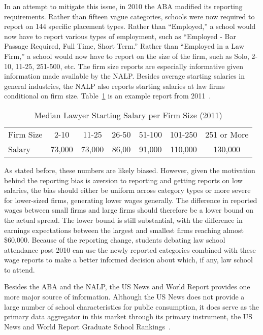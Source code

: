 \documentclass[12pt]{article}
\theoremstyle{definition}
\begin{document}
In an attempt to mitigate this issue, in 2010 the ABA modified its reporting requirements. Rather than fifteen vague categories, schools were now required to report on 144 specific placement types. Rather than ``Employed,'' a school would now have to report various types of employment, such as ``Employed - Bar Passage Required, Full Time, Short Term.'' Rather than ``Employed in a Law Firm,'' a school would now have to report on the size of the firm, such as Solo, 2-10, 11-25, 251-500, etc. The firm size reports are especially informative given information made available by the NALP. Besides average starting salaries in general industries, the NALP also reports starting salaries at law firms conditional on firm size. Table~\ref{tab:nalp} is an example report from 2011~\cite{NALP2011}.
\begin{table}[htp]
\begin{center}
\begin{tabular}{lcccccc}
\hline
\hline
Firm Size & 2-10 & 11-25 & 26-50 & 51-100 & 101-250 & 251 or More \\
Salary & 73,000 & 73,000 & 86,00 & 91,000 & 110,000 & 130,000 \\
\hline
\end{tabular}
\end{center}
\caption{Median Lawyer Starting Salary per Firm Size (2011)}
\label{tab:nalp}
\end{table}
As stated before, these numbers are likely biased. However, given the motivation behind the reporting bias is aversion to reporting and getting reports on low salaries, the bias should either be uniform across category types or more severe for lower-sized firms, generating lower wages generally. The difference in reported wages between small firms and large firms should therefore be a lower bound on the actual spread. The lower bound is still substantial, with the difference in earnings expectations between the largest and smallest firms reaching almost \$60,000. Because of the reporting change, students debating law school attendance post-2010 can use the newly reported categories combined with these wage reports to make a better informed decision about which, if any, law school to attend.

Besides the ABA and the NALP, the US News and World Report provides one more major source of information. Although the US News does not provide a large number of school characteristics for public consumption, it does serve as the primary data aggregator in this market through its primary instrument, the US News and World Report Graduate School Rankings~\cite{USNews}.
\end{document}
